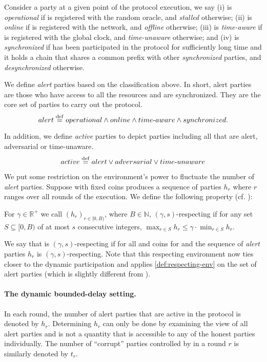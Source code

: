 Consider a party \party at a given point of the protocol execution, we say
%
(i) \party is \emph{operational} if \party is registered with the random oracle, and \emph{stalled} otherwise;
%
(ii) \party is \emph{online} if \party is registered with the network, and \emph{offline} otherwise;
%
(iii) \party is \emph{time-aware} if \party is registered with the global clock, and \emph{time-unaware} otherwise;
%
and (iv) \party is \emph{synchronized} if \party has been participated in the protocol for sufficiently long time and it holds a chain that shares a common prefix with other \emph{synchronized} parties, and \emph{desynchronized} otherwise.

We define \emph{alert} parties based on the classification above.
%
In short, alert parties are those who have access to all the resources and are synchronized. They are the core set of parties to carry out the protocol.
%
\[
    alert \overset{\mathrm{def}}{=} operational \wedge online \wedge time\text{-}aware \wedge synchronized.
\]

In addition, we define \emph{active} parties to depict parties including all that are alert, adversarial or time-unaware.
%
\[
    active \overset{\mathrm{def}}{=} alert \vee adversarial \vee time\text{-}unaware
\]

We put some restriction on the environment's power to fluctuate the number of \emph{alert} parties.
%
Suppose \Z with fixed coins produces a sequence of parties $h_r$ where $r$ ranges over all rounds of the execution. We define the following property (cf. \cite{EPRINT:GarKiaLeo20}):
%
\begin{definition} \label{def:respecting-env}
    For $\gamma \in \mathbb{R}^+$ we call $(h_r)_{r \in [0, B)}$, where $B \in \mathbb{N}$, $(\gamma, s)$-respecting if for any set $S \subseteq [0, B)$ of at most $s$ consecutive integers, $\max_{r \in S} h_r \le \gamma \cdot \min_{r \in S} h_r$.
\end{definition}

We say that \Z is $(\gamma, s)$-respecting if for all \adv and coins for \Z and \adv the sequence of \emph{alert} parties $h_r$ is $(\gamma, s)$-respecting.
%
Note that this respecting environment now ties closer to the dynamic participation and applies \cref{def:respecting-env} on the set of alert parties (which is slightly different from \cite{C:GarKiaLeo17,EPRINT:GarKiaLeo20}).

\paragraph{The dynamic bounded-delay setting.}
%
In each round, the number of alert parties that are active in the protocol is denoted by $h_r$.
%
Determining $h_r$ can only be done by examining the view of all alert parties and is not a quantity that is accessible to any of the honest parties individually.
%
The number of ``corrupt'' parties controlled by \adv in a round $r$ is similarly denoted by $t_r$.

